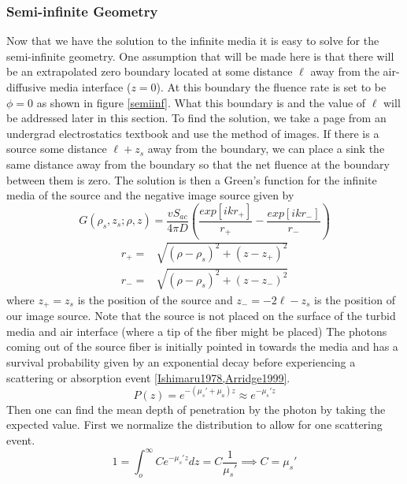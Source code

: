 \subsubsection{Semi-infinite Geometry}
Now that we have the solution to the infinite media it is easy to solve for the semi-infinite geometry. One assumption that will be made here is that there will be an extrapolated zero boundary located at some distance $\ell$ away from the air-diffusive media interface ($z=0$). At this boundary the fluence rate is set to be $\phi=0$ as shown in figure \ref{semiinf}. What this boundary is and the value of $\ell$ will be addressed later in this section. 
To find the solution, we take a page from an undergrad electrostatics textbook and use the method of images. If there is a source some distance $\ell + z_s$ away from the boundary, we can place a sink the same distance away from the boundary so that the net fluence at the boundary between them is zero. The solution is then a Green's function for the infinite media of the source and the negative image source given by
\begin{equation}
\label{semisoln}
G(\rho_s,z_s;\rho,z) = \frac{vS_{ac}}{4\pi D} \left( \frac{exp[ikr_+]}{r_+} 
- \frac{exp[ikr_-]}{r_-} \right) \nonumber
\end{equation}
\begin{eqnarray}
\label{ext_both}
r_{+} = & \sqrt{(\rho-\rho_s)^2+(z-z_{+})^2} \nonumber \\
r_{-} = & \sqrt{(\rho-\rho_s)^2+(z-z_{-})^2}
\end{eqnarray}
\noindent
where $z_+=z_s$ is the position of the source and $z_-=-2\ell-z_s$ is the position of our image source. Note that the source is not placed on the surface of the turbid media and air interface (where a tip of the fiber might be placed) The photons coming out of the source fiber is initially pointed in towards the media and has a survival probability given by an exponential decay before experiencing a scattering or absorption event \ref{Ishimaru1978,Arridge1999}.
\noindent
\begin{equation}
\label{scatterprob}
  P(z) = e^{-(\mu_s'+\mu_a)z} \approx e^{-\mu_s'z}
\end{equation}
\noindent
Then one can find the mean depth of penetration by the photon by taking the expected value. First we normalize the distribution to allow for one scattering event.
\noindent
\begin{equation}
  1 = \int_o^\infty C e^{-\mu_s'z}dz = C \frac{1}{\mu_s'} \implies C = \mu_s'
\end{equation}  
